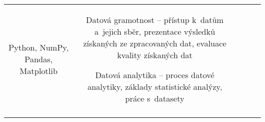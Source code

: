 \begin{landscape}
\begin{table}[htbp]
{\begin{tabularx}{\linewidth}{CCCCC}
Python, NumPy, Pandas, Matplotlib

&

Datová gramotnost – přístup k~datům a~jejich sběr, prezentace výsledků získaných ze zpracovaných dat, evaluace kvality získaných dat

Datová analytika – proces datové analytiky, základy statistické analýzy, práce s~datasety

\\

\tabularnewline
\bottomrule
\end{tabularx}

}

\end{table}

\end{landscape}